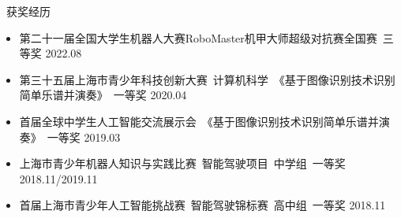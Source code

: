 \documentclass[UTF8]{resume}
\begin{document}
\begin{rSection}{\faAward~获奖经历}
    \begin{itemize}
        \itemsep -0.5em
        \item 第二十一届全国大学生机器人大赛RoboMaster机甲大师超级对抗赛全国赛~三等奖 \hfill 2022.08
        \item 第三十五届上海市青少年科技创新大赛~计算机科学~《基于图像识别技术识别简单乐谱并演奏》~一等奖 \hfill 2020.04
        \item 首届全球中学生人工智能交流展示会~《基于图像识别技术识别简单乐谱并演奏》~一等奖 \hfill 2019.03
        \item 上海市青少年机器人知识与实践比赛~智能驾驶项目~中学组~一等奖 \hfill 2018.11/2019.11
        \item 首届上海市青少年人工智能挑战赛~智能驾驶锦标赛~高中组~一等奖 \hfill 2018.11
    \end{itemize}
\end{rSection}
\end{document}
